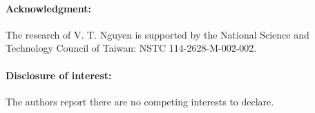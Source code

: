 \documentclass[11pt,reqno]{amsart}
\theoremstyle{definition}
\theoremstyle{bfremark}
\numberwithin{equation}{section}
\begin{document}
\vspace{10pt}

\paragraph{\textbf{Acknowledgment:}} The research of V. T. Nguyen is supported by the National Science and Technology Council of Taiwan: NSTC 114-2628-M-002-002.


\vspace{5pt}

\paragraph{\textbf{Disclosure of interest:}} The authors report there are no competing interests to declare. 




\appendix
\end{document}
